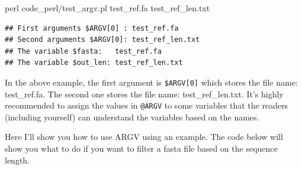 \documentclass[]{book}
\makeatletter
\newenvironment{Shaded}{\begin{snugshade}}{\end{snugshade}}
\newcommand{\FunctionTok}[1]{\textcolor[rgb]{0.00,0.00,0.00}{#1}}
\newcommand{\NormalTok}[1]{#1}
\newenvironment{kframe}{%
\medskip{}
\setlength{\fboxsep}{.8em}
 \def\at@end@of@kframe{}%
 \ifinner\ifhmode%
  \def\at@end@of@kframe{\end{minipage}}%
  \begin{minipage}{\columnwidth}%
 \fi\fi%
 \def\FrameCommand##1{\hskip\@totalleftmargin \hskip-\fboxsep
 \colorbox{shadecolor}{##1}\hskip-\fboxsep
     \hskip-\linewidth \hskip-\@totalleftmargin \hskip\columnwidth}%
 \MakeFramed {\advance\hsize-\width
   \@totalleftmargin\z@ \linewidth\hsize
   \@setminipage}}%
 {\par\unskip\endMakeFramed%
 \at@end@of@kframe}
\renewenvironment{Shaded}{\begin{kframe}}{\end{kframe}}
\theoremstyle{definition}
\theoremstyle{definition}
\theoremstyle{definition}
\theoremstyle{remark}
\makeatother
\begin{document}
\begin{Shaded}
\begin{Highlighting}[]
\FunctionTok{perl}\NormalTok{ code_perl/test_argv.pl test_ref.fa test_ref_len.txt}
\end{Highlighting}
\end{Shaded}

\begin{verbatim}
## First arguments $ARGV[0] : test_ref.fa
## Second arguments $ARGV[0]: test_ref_len.txt
## The variable $fasta:   test_ref.fa
## The variable $out_len: test_ref_len.txt
\end{verbatim}

In the above example, the first argument is \texttt{\$ARGV{[}0{]}} which
stores the file name: test\_ref.fa. The second one stores the file name:
test\_ref\_len.txt. It's highly recommended to assign the values in
\texttt{@ARGV} to some variables that the readers (including yourself)
can understand the variables based on the names.

Here I'll show you how to use ARGV using an example. The code below will
show you what to do if you want to filter a fasta file based on the
sequence length.
\end{document}
